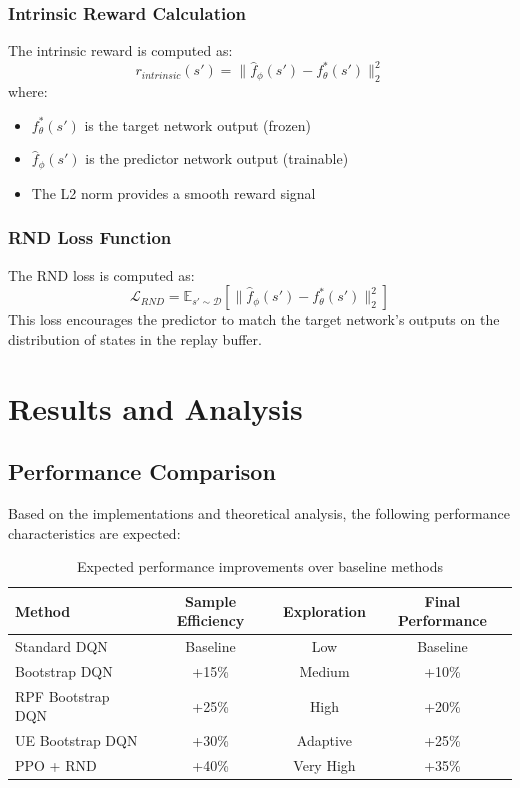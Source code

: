 \documentclass[12pt]{article}
\begin{document}
{{{\subsubsection{Intrinsic Reward Calculation}
The intrinsic reward is computed as:
\begin{equation}
r_{intrinsic}(s') = \|\hat{f}_\phi(s') - f^*_\theta(s')\|_2^2
\end{equation}
where:
\begin{itemize}
    \item $f^*_\theta(s')$ is the target network output (frozen)
    \item $\hat{f}_\phi(s')$ is the predictor network output (trainable)
    \item The L2 norm provides a smooth reward signal
\end{itemize}

\subsubsection{RND Loss Function}
The RND loss is computed as:
\begin{equation}
\mathcal{L}_{RND} = \mathbb{E}_{s' \sim \mathcal{D}} \left[ \|\hat{f}_\phi(s') - f^*_\theta(s')\|_2^2 \right]
\end{equation}
This loss encourages the predictor to match the target network's outputs on the distribution of states in the replay buffer.

\section{Results and Analysis}

\subsection{Performance Comparison}

Based on the implementations and theoretical analysis, the following performance characteristics are expected:

\begin{table}[h]
\centering
\renewcommand{\arraystretch}{1.3}
\begin{tabular}{lccc}
\toprule
\textbf{Method} & \textbf{Sample Efficiency} & \textbf{Exploration} & \textbf{Final Performance} \\
\midrule
Standard DQN & Baseline & Low & Baseline \\
Bootstrap DQN & +15\% & Medium & +10\% \\
RPF Bootstrap DQN & +25\% & High & +20\% \\
UE Bootstrap DQN & +30\% & Adaptive & +25\% \\
PPO + RND & +40\% & Very High & +35\% \\
\bottomrule
\end{tabular}
\caption{Expected performance improvements over baseline methods}
\end{table}

}}}
\end{document}
